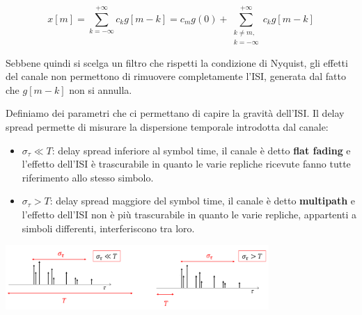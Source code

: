 \[
    x\left[m\right] = \sum_{k=-\infty}^{+\infty} c_k g\left[m - k \right] = c_m g(0) + \sum_{\substack{k \neq m,\\ k=-\infty}}^{+\infty} c_{k} g\left[m-k\right]
\]


Sebbene quindi si scelga un filtro che rispetti la condizione di Nyquist, gli effetti del canale non permettono di rimuovere completamente l'ISI, generata dal fatto che $g\left[m-k\right]$ non si annulla.


Definiamo dei parametri che ci permettano di capire la gravità dell'ISI. Il delay spread permette di misurare la dispersione temporale introdotta dal canale:
\begin{itemize}
    \item $\sigma_\tau \ll T$: delay spread inferiore al symbol time, il canale è detto \textbf{flat fading}  e l'effetto dell'ISI è trascurabile in quanto le varie repliche ricevute fanno tutte riferimento allo stesso simbolo.
    \item $\sigma_\tau > T$: delay spread maggiore del symbol time, il canale è detto \textbf{multipath} e l'effetto dell'ISI non è più trascurabile in quanto le varie repliche, appartenti a simboli differenti, interferiscono tra loro.
\end{itemize}

\begin{center}
    \includegraphics[width=0.75\textwidth]{imgs/delay_spread.png}
\end{center}


